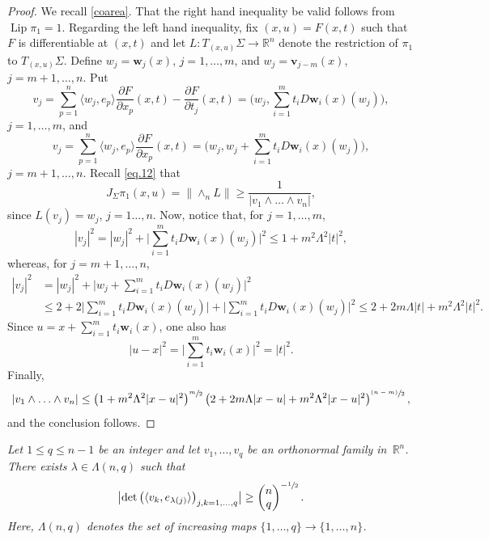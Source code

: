 \documentclass[JEP,XML,SOM,Unicode,ThmDefs,NoEqCountersInSection]{cedram}
\newcommand{\psfrac}[2]{\sfrac{(#1)}{#2}}
\newenvironment{Empty}[2][\null]{%
\begin{enonce}[remark]{#1}#2}
{\end{enonce}}
\newcommand{\R}{\mathbb{R}}
\newcommand{\Rn}{\R^n}
\newcommand{\bv}{{\boldsymbol{v}}}
\newcommand{\bw}{{\boldsymbol{w}}}
\DeclareMathOperator{\rmLip}{\mathrm{Lip}}
\newcommand{\bin}[2]{
\begin{pmatrix} #1 \\
#2
\end{pmatrix}}
\let\la\langle
\let\ra\rangle
\begin{document}
\begin{proof}
We recall \ref{coarea}.
That the right hand inequality be valid follows from~\hbox{$\rmLip \pi_1 \!=\! 1$}.
Regarding the left hand inequality, fix $(x,u) = F(x,t)$ such that $F$ is differentiable at $(x,t)$ and let $L: T_{(x,u)}\Sigma \to \R^n$ denote the restriction of $\pi_1$ to $T_{(x,u)}\Sigma$.
Define $w_j = \bw_j(x)$, $j=1,\ldots,m$, and $w_j = \bv_{j-m}(x)$, $j=m+1,\ldots,n$.
Put
\begin{equation*}
v_j = \sum_{p=1}^n \la w_j,e_p \ra\frac{\partial F}{\partial x_p}(x,t) - \frac{\partial F}{\partial t_j}(x,t) = \biggl(w_j,\sum_{i=1}^m t_i D\bw_i(x)(w_j) \biggr),
\end{equation*}
$j=1,\ldots,m$, and
\begin{equation*}
v_j = \sum_{p=1}^n \la w_j,e_p \ra\frac{\partial F}{\partial x_p}(x,t) = \biggl(w_j, w_j +\sum_{i=1}^m t_i D\bw_i(x)(w_j) \biggr),
\end{equation*}
$j=m+1,\ldots,n$.
Recall \eqref{eq.12} that
\begin{equation*}
J_\Sigma \pi_1(x,u) = \|{\wedge}_n L \| \geq \frac{1}{|v_1 \wedge \ldots \wedge v_n|},
\end{equation*}
since $L(v_j)=w_j$, $j=1\ldots,n$.
Now, notice that, for $j=1,\ldots,m$,
\begin{equation*}
\left| v_j\right|^2 = |w_j|^2 + \biggl| \sum_{i=1}^m t_i D \bw_i(x)(w_j)\biggr|^2
\leq 1 + m^2\Lambda^2|t|^2,
\end{equation*}
whereas, for $j=m+1,\ldots,n$,
\begin{align*}
\left| v_j \right|^2 &= |w_j|^2 + \biggl| w_j + \sum_{i=1}^m t_i D \bw_i(x)(w_j)\biggr|^2\\
&\leq 2 + 2 \biggl|\sum_{i=1}^m t_i D \bw_i(x)(w_j) \biggr| + \biggl|\sum_{i=1}^m t_i D \bw_i(x)(w_j) \biggr|^2
\leq 2 + 2 m \Lambda |t| + m^2\Lambda^2|t|^2.
\end{align*}
Since $u = x + \sum_{i=1}^m t_i \bw_i(x)$, one also has
\begin{equation*}
|u-x|^2 = \biggl| \sum_{i=1}^m t_i \bw_i(x) \biggr|^2 = |t|^2.
\end{equation*}
Finally,
\[
|v_1 \wedge \ldots \wedge v_n |
\leq \left(1 + m^2 \Lambda^2 |x-u|^2 \right)^{\sfrac{m}{2}}\left(2 + 2 m \Lambda |x-u| + m^2\Lambda^2|x-u|^2 \right)^{\psfrac{n-m}{2}},
\]
and the conclusion follows.
\end{proof}

\begin{Empty}[]
\label{34}
{\it
Let $1 \leq q \leq n-1$ be an integer and let $v_1,\ldots,v_q$ be an orthonormal family in~$\Rn$. There exists $\lambda \in \Lambda(n,q)$ such that
\begin{equation*}
\bigl| \det \left(\la v_k, e_{\lambda(j)} \ra \right)_{j,k=1,\ldots,q}\bigr| \geq \bin{n}{q}^{-\sfrac{1}{2}}.
\end{equation*}
Here, $\Lambda(n,q)$ denotes the set of increasing maps $\{1,\ldots,q\} \to \{1,\ldots,n\}$.
}
\end{Empty}
\end{document}
